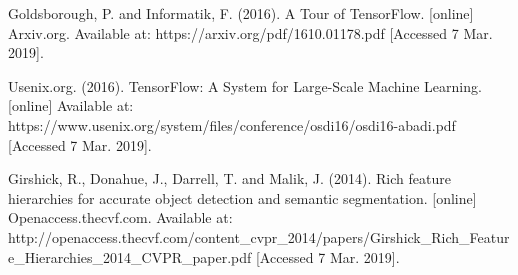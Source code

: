 \documentclass[notitlepage]{report}
\begin{document}
\begin{thebibliography}{9}

Goldsborough, P. and Informatik, F. (2016). A Tour of TensorFlow. [online] Arxiv.org. Available at: https://arxiv.org/pdf/1610.01178.pdf [Accessed 7 Mar. 2019].

Usenix.org. (2016). TensorFlow: A System for Large-Scale Machine Learning. [online] Available at: https://www.usenix.org/system/files/conference/osdi16/osdi16-abadi.pdf [Accessed 7 Mar. 2019].


Girshick, R., Donahue, J., Darrell, T. and Malik, J. (2014). Rich feature hierarchies for accurate object detection and semantic segmentation. [online] Openaccess.thecvf.com. Available at: http://openaccess.thecvf.com/content_cvpr_2014/papers/Girshick_Rich_Feature_Hierarchies_2014_CVPR_paper.pdf [Accessed 7 Mar. 2019].

\end{thebibliography}
\end{document}
